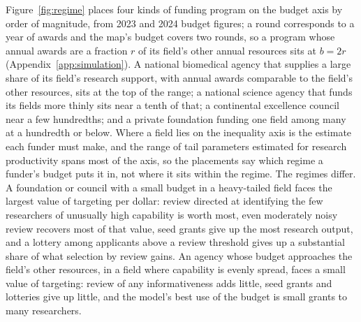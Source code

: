 \documentclass[article, 11pt, reqno]{amsart}
\theoremstyle{named}
\begin{document}
Figure~\ref{fig:regime} places four kinds of funding program on the budget axis by order of magnitude, from 2023 and 2024 budget figures; a round corresponds to a year of awards and the map's budget covers two rounds, so a program whose annual awards are a fraction $r$ of its field's other annual resources sits at $b = 2r$ (Appendix~\ref{app:simulation}). A national biomedical agency that supplies a large share of its field's research support, with annual awards comparable to the field's other resources, sits at the top of the range; a national science agency that funds its fields more thinly sits near a tenth of that; a continental excellence council near a few hundredths; and a private foundation funding one field among many at a hundredth or below. Where a field lies on the inequality axis is the estimate each funder must make, and the range of tail parameters estimated for research productivity spans most of the axis, so the placements say which regime a funder's budget puts it in, not where it sits within the regime. The regimes differ. A foundation or council with a small budget in a heavy-tailed field faces the largest value of targeting per dollar: review directed at identifying the few researchers of unusually high capability is worth most, even moderately noisy review recovers most of that value, seed grants give up the most research output, and a lottery among applicants above a review threshold gives up a substantial share of what selection by review gains. An agency whose budget approaches the field's other resources, in a field where capability is evenly spread, faces a small value of targeting: review of any informativeness adds little, seed grants and lotteries give up little, and the model's best use of the budget is small grants to many researchers.


\end{document}
